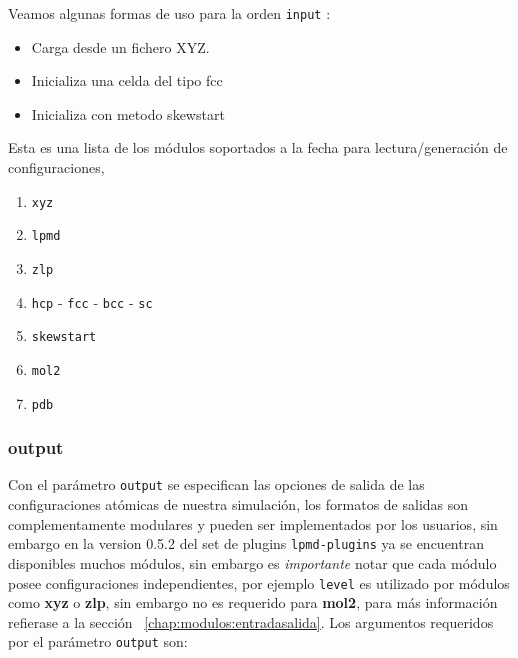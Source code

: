 Veamos algunas formas de uso para la orden \verb|input| :

\begin{itemize}
\item Carga desde un fichero XYZ.
\item Inicializa una celda del tipo fcc
\item Inicializa con metodo skewstart
\end{itemize}

Esta es una lista de los m\'odulos soportados a la fecha para lectura/generaci\'on de configuraciones,

\begin{enumerate}
 \item \verb|xyz|
 \item \verb|lpmd|
 \item \verb|zlp|
 \item \verb|hcp| - \verb|fcc| - \verb|bcc| - \verb|sc|
 \item \verb|skewstart|
 \item \verb|mol2|
 \item \verb|pdb|
\end{enumerate}


\subsubsection{output}

Con el par\'ametro \verb|output| se especifican las opciones de salida de las configuraciones at\'omicas de nuestra simulaci\'on, los formatos de salidas son complementamente modulares y pueden ser implementados por los usuarios, sin embargo en la version 0.5.2 del set de plugins \verb|lpmd-plugins| ya se encuentran disponibles muchos m\'odulos, sin embargo es \textit{importante} notar que cada m\'odulo posee configuraciones independientes, por ejemplo \verb|level| es utilizado por m\'odulos como \textbf{xyz} o \textbf{zlp}, sin embargo no es requerido para \textbf{mol2}, para m\'as informaci\'on refierase a la secci\'on ~\ref{chap:modulos:entradasalida}. Los argumentos requeridos por el par\'ametro \verb|output| son:


